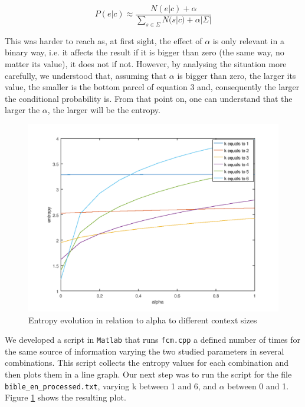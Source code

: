 \documentclass[12pt]{article}
\begin{document}
\begin{equation}
  P(e|c) \approx \frac{N(e|c) + \alpha}{\sum\limits_{s\in\Sigma}N(s|c) + \alpha|\Sigma|}
\end{equation}

This was harder to reach as, at first sight, the effect of $\alpha$ is only 
relevant in a binary way, i.e. it affects the result if it is bigger than 
zero (the same way, no matter its value), it does not if not.
However, by analysing the situation more carefully, we understood that,
assuming that $\alpha$ is bigger than zero, the larger its value, the smaller
is the bottom parcel of equation 3 and, consequently the larger the 
conditional probability is.
From that point on, one can understand that the larger the $\alpha$, the larger
will be the entropy.\\

\begin{figure}[h!]
  \includegraphics[width=\linewidth]{bible_en.png}
  \caption{Entropy evolution in relation to alpha to different context sizes}
  \label{entropyBehavior}
\end{figure}

We developed a script in \texttt{Matlab} that runs \texttt{fcm.cpp} a
defined number of times for the same source of information varying the 
two studied parameters in several combinations.
This script collects the entropy values for each combination and then plots
them in a line graph.
Our next step was to run the script for the file 
\texttt{bible\_en\_processed.txt}, varying k between 1 and 6, and $\alpha$ 
between 0 and 1.
Figure \ref{entropyBehavior} shows the resulting plot.
\end{document}
